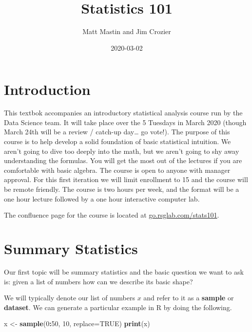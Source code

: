 \documentclass[]{book}
\title{Statistics 101}
\author{Matt Mastin and Jim Crozier}
\date{2020-03-02}
\newenvironment{Shaded}{\begin{snugshade}}{\end{snugshade}}
\newcommand{\DataTypeTok}[1]{\textcolor[rgb]{0.13,0.29,0.53}{#1}}
\newcommand{\DecValTok}[1]{\textcolor[rgb]{0.00,0.00,0.81}{#1}}
\newcommand{\KeywordTok}[1]{\textcolor[rgb]{0.13,0.29,0.53}{\textbf{#1}}}
\newcommand{\NormalTok}[1]{#1}
\newcommand{\OperatorTok}[1]{\textcolor[rgb]{0.81,0.36,0.00}{\textbf{#1}}}
\newcommand{\OtherTok}[1]{\textcolor[rgb]{0.56,0.35,0.01}{#1}}
\newcommand{\StringTok}[1]{\textcolor[rgb]{0.31,0.60,0.02}{#1}}
\begin{document}
\maketitle

{
\setcounter{tocdepth}{1}
\tableofcontents
}
\hypertarget{intro}{%
\chapter{Introduction}\label{intro}}

This textbok accompanies an introductory statistical analysis course run by the Data Science team. It will take place over the 5 Tuesdays in March 2020 (though March 24th will be a review / catch-up day\ldots{} go vote!). The purpose of this course is to help develop a solid foundation of basic statistical intuition. We aren't going to dive too deeply into the math, but we aren't going to shy away understanding the formulas. You will get the most out of the lectures if you are comfortable with basic algebra. The course is open to anyone with manager approval. For this first iteration we will limit enrollment to 15 and the course will be remote friendly. The course is two hours per week, and the format will be a one hour lecture followed by a one hour interactive computer lab.

The confluence page for the course is located at \url{go.rsglab.com/stats101}.

\hypertarget{summarystats}{%
\chapter{Summary Statistics}\label{summarystats}}

Our first topic will be summary statistics and the basic question we want to ask is: given a list of numbers how can we describe its basic shape?

We will typically denote our list of numbers \(x\) and refer to it as a \textbf{sample} or \textbf{dataset}. We can generate a particular example in R by doing the following.

\begin{Shaded}
\begin{Highlighting}[]
\NormalTok{x <-}\StringTok{ }\KeywordTok{sample}\NormalTok{(}\DecValTok{0}\OperatorTok{:}\DecValTok{50}\NormalTok{, }\DecValTok{10}\NormalTok{, }\DataTypeTok{replace=}\OtherTok{TRUE}\NormalTok{)}
\KeywordTok{print}\NormalTok{(x)}
\end{Highlighting}
\end{Shaded}
\end{document}
